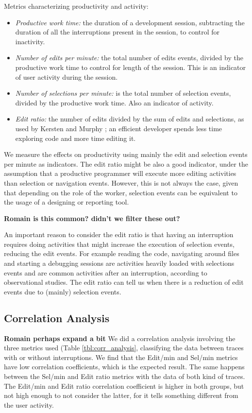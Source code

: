 \documentclass[times]{smrauth}
\newcommand\RR[1]{\textbf{Romain #1}}
\begin{document}
Metrics characterizing productivity and activity:
\begin{itemize}
	\item \textit{Productive work time:} the duration of a development session, subtracting the duration of all the interruptions present in the session, to control for inactivity.
	\item \textit{Number of edits per minute:} the total number of edits events, divided by the productive work time to control for length of the session. This is an indicator of user activity during the session.
	\item \textit{Number of selections per minute:} is the total number of selection events, divided by the productive work time. Also an indicator of activity.
	\item \textit{Edit ratio:} the number of edits divided by the sum of edits and selections, as used by Kersten and Murphy \cite{KM06}; an efficient developer spends less time exploring code and more time editing it.
\end{itemize} 

We measure the effects on productivity using mainly the edit and selection events per minute as indicators. The edit ratio might be also a good indicator, under the assumption that a productive programmer will execute more editing activities than selection or navigation events. However, this is not always the case, given that depending on the role of the worker, selection events can be equivalent to the usage of a designing or reporting tool. 

\RR{is this common? didn't we filter these out?}

An important reason to consider the edit ratio is that having an interruption requires doing activities that might increase the execution of selection events, reducing the edit events. For example reading the code, navigating around files and starting a debugging sessions are activities heavily loaded with selections events and are common activities after an interruption, according to observational studies. The edit ratio can tell us when there is a reduction of edit events due to (mainly) selection events.

\subsection{Correlation Analysis}
\RR{perhaps expand a bit}
We did a correlation analysis involving the three metrics used (Table \ref{tbl:corr_analysis}, classifying the data between traces with or without interruptions. We find that the Edit/min and Sel/min metrics have low correlation coefficients, which is the expected result. The same happens between the Sel/min and Edit ratio metrics with the data of both kind of traces. The Edit/min and Edit ratio correlation coefficient is higher in both groups, but not high enough to not consider the latter, for it tells something different from the user activity.
\end{document}

